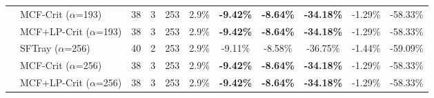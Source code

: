 \begin{table}[t]
{\begin{tabular}{ll|cccc|ccc|cc}
 & MCF-Crit ($\alpha$=193) & 38 & 3 & 253 & 2.9\% & \textbf{-9.42\%} & \textbf{-8.64\%} & \textbf{-34.18\%} & -1.29\% & -58.33\% \\

 & MCF+LP-Crit ($\alpha$=193) & 38 & 3 & 253 & 2.9\% & \textbf{-9.42\%} & \textbf{-8.64\%} & \textbf{-34.18\%} & -1.29\% & -58.33\% \\

\addlinespace[0.5em]

 & SFTray ($\alpha$=256) & 40 & 2 & 253 & 2.9\% & -9.11\% & -8.58\% & -36.75\% & -1.44\% & -59.09\% \\

 & MCF-Crit ($\alpha$=256) & 38 & 3 & 253 & 2.9\% & \textbf{-9.42\%} & \textbf{-8.64\%} & \textbf{-34.18\%} & -1.29\% & -58.33\% \\

 & MCF+LP-Crit ($\alpha$=256) & 38 & 3 & 253 & 2.9\% & \textbf{-9.42\%} & \textbf{-8.64\%} & \textbf{-34.18\%} & -1.29\% & -58.33\% \\

\midrule

\bottomrule

\end{tabular}

}

\end{table}

